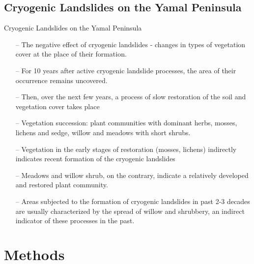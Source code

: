 \documentclass[pdflatex,compress,9pt,
	xcolor={dvipsnames,dvipsnames,svgnames,x11names,table},
	hyperref={colorlinks = true,breaklinks = true, urlcolor = NavyBlue, breaklinks = true}]{beamer}
\begin{document}
\subsection{Cryogenic Landslides on the Yamal Peninsula}
\begin{frame}{Cryogenic Landslides on the Yamal Peninsula}
\begin{itemize}
       \item[--] The negative effect of cryogenic landslides - changes in types of vegetation cover at the place of their formation.
       \item[--] For 10 years after active cryogenic landslide processes, the area of their occurrence remains uncovered.
       \item[--] Then, over the next few years, a process of slow restoration of the soil and vegetation cover takes place 
       \item[--] Vegetation succession: plant communities with dominant herbs, mosses, lichens and sedge, willow and meadows with short shrubs.
       \item[--] Vegetation in the early stages of restoration (mosses, lichens) indirectly indicates recent formation of the cryogenic landslides 
       \item[--] Meadows and willow shrub, on the contrary, indicate a relatively developed and restored plant community. 
       \item[--] Areas subjected to the formation of cryogenic landslides in past 2-3 decades are usually characterized by the spread of willow and shrubbery, an indirect indicator of these processes in the past.
\end{itemize}
\end{frame}

\section{Methods}
\end{document}
